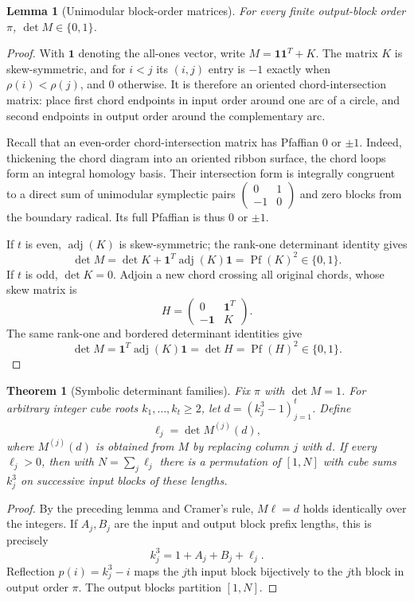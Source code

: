 \documentclass[10pt]{article}
\newtheorem{theorem}{Theorem}
\newtheorem{lemma}{Lemma}
\begin{document}
\begin{lemma}[Unimodular block-order matrices]
\label{lem:unimodular-block}
For every finite output-block order $\pi$,
$\det M\in\{0,1\}$.
\end{lemma}
\begin{proof}
With $\boldsymbol1$ denoting the all-ones
vector, write $M=\boldsymbol1\boldsymbol1^T+K$.
The matrix $K$ is skew-symmetric, and for
$i<j$ its $(i,j)$ entry is $-1$ exactly
when $\rho(i)<\rho(j)$, and $0$ otherwise.
It is therefore an oriented chord-intersection
matrix: place first chord endpoints in
input order around one arc of a circle,
and second endpoints in output order around
the complementary arc.

Recall that an even-order chord-intersection
matrix has Pfaffian $0$ or $\pm1$.
Indeed, thickening the chord diagram into an
oriented ribbon surface, the chord loops form an
integral homology basis. Their intersection form
is integrally congruent to a direct sum of
unimodular symplectic pairs
$\left(\begin{smallmatrix}0&1\\-1&0\end{smallmatrix}\right)$
and zero blocks from the boundary radical.
Its full Pfaffian is thus $0$ or $\pm1$.

If $t$ is even, $\operatorname{adj}(K)$ is
skew-symmetric; the rank-one determinant
identity gives
\[
\det M=\det K+
\boldsymbol1^T\operatorname{adj}(K)\boldsymbol1
=\operatorname{Pf}(K)^2\in\{0,1\}.
\]
If $t$ is odd, $\det K=0$. Adjoin a new
chord crossing all original chords, whose
skew matrix is
\[
H=\begin{pmatrix}
0&\boldsymbol1^T\\
-\boldsymbol1&K
\end{pmatrix}.
\]
The same rank-one and bordered determinant
identities give
\[
\det M=\boldsymbol1^T\operatorname{adj}(K)
\boldsymbol1=\det H=\operatorname{Pf}(H)^2
\in\{0,1\}.
\]
\end{proof}

\begin{theorem}[Symbolic determinant families]
\label{thm:unimodular-block-factory}
Fix $\pi$ with $\det M=1$.
For arbitrary integer cube roots
$k_1,\ldots,k_t\ge2$, let
$d=(k_j^3-1)_{j=1}^t$. Define
\[
\ell_j=\det M^{(j)}(d),
\]
where $M^{(j)}(d)$ is obtained from $M$
by replacing column $j$ with $d$.
If every $\ell_j>0$, then with
$N=\sum_j\ell_j$ there is a permutation
of $[1,N]$ with cube sums $k_j^3$ on
successive input blocks of these lengths.
\end{theorem}
\begin{proof}
By the preceding lemma and Cramer's rule,
$M\ell=d$ holds identically over the integers.
If $A_j,B_j$ are the input and output block
prefix lengths, this is precisely
\[
k_j^3=1+A_j+B_j+\ell_j.
\]
Reflection $p(i)=k_j^3-i$ maps the
$j$th input block bijectively to the
$j$th block in output order $\pi$.
The output blocks partition $[1,N]$.
\end{proof}
\end{document}

